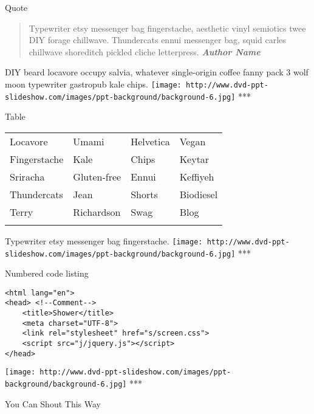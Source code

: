 \documentclass[ignorenonframetext,]{beamer}
\makeatletter
\def\ScaleIfNeeded{%
  \ifdim\Gin@nat@width>\linewidth
    \linewidth
  \else
    \Gin@nat@width
  \fi
}
\let\Oldincludegraphics\includegraphics
\renewcommand{\includegraphics}[2][]{\Oldincludegraphics[width=\ScaleIfNeeded]{#2}}
\makeatother
\begin{document}
\begin{frame}[fragile]

\begin{block}{Quote}

\begin{quote}
Typewriter etsy messenger bag fingerstache, aesthetic vinyl semiotics
twee DIY forage chillwave. Thundercats ennui messenger bag, squid carles
chillwave shoreditch pickled cliche letterpress. \emph{\textbf{Author
Name}}
\end{quote}

DIY beard locavore occupy salvia, whatever single-origin coffee fanny
pack 3 wolf moon typewriter gastropub kale chips.
\texttt{[image: http://www.dvd-ppt-slideshow.com/images/ppt-background/background-6.jpg]}
***

\end{block}

\begin{block}{Table}

\begin{longtable}[c]{@{}llll@{}}
\toprule\addlinespace
Locavore & Umami & Helvetica & Vegan
\\\addlinespace
\midrule\endhead
Fingerstache & Kale & Chips & Keytar
\\\addlinespace
Sriracha & Gluten-free & Ennui & Keffiyeh
\\\addlinespace
Thundercats & Jean & Shorts & Biodiesel
\\\addlinespace
Terry & Richardson & Swag & Blog
\\\addlinespace
\bottomrule
\end{longtable}

Typewriter etsy messenger bag fingerstache.
\texttt{[image: http://www.dvd-ppt-slideshow.com/images/ppt-background/background-6.jpg]}
***

\end{block}

\begin{block}{Numbered code listing}

\begin{verbatim}
<html lang="en">
<head> <!--Comment-->
    <title>Shower</title>
    <meta charset="UTF-8">
    <link rel="stylesheet" href="s/screen.css">
    <script src="j/jquery.js"></script>
</head>
\end{verbatim}

\texttt{[image: http://www.dvd-ppt-slideshow.com/images/ppt-background/background-6.jpg]}
***

\end{block}

\begin{block}{You Can Shout This Way}

\end{block}

\end{frame}
\end{document}
